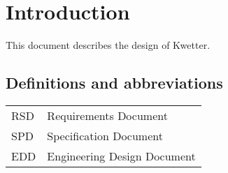\chapter{Introduction}
This document describes the design of Kwetter.

\section{Definitions and abbreviations}

\begin{tabularx}{\textwidth}{l|X}
    RSD & Requirements Document\\
    SPD & Specification Document\\
    EDD & Engineering Design Document\\
\end{tabularx}